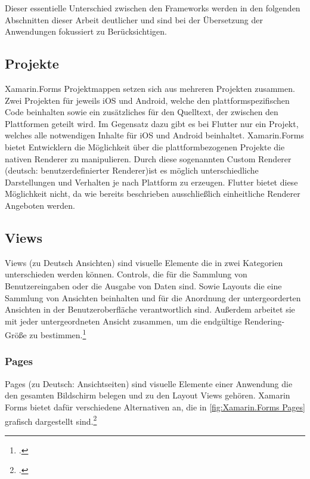 Dieser essentielle Unterschied zwischen den Frameworks werden in den folgenden Abschnitten dieser Arbeit deutlicher und sind bei der Übersetzung der Anwendungen fokussiert zu Berücksichtigen. 
\subsection{Projekte}
Xamarin.Forms Projektmappen setzen sich aus mehreren Projekten zusammen.  Zwei Projekten für jeweils iOS und Android,  welche den plattformspezifischen Code beinhalten sowie ein zusätzliches für den Quelltext,  der zwischen den Plattformen geteilt wird.  Im Gegensatz dazu gibt es bei Flutter nur ein Projekt, welches alle notwendigen Inhalte für iOS und Android beinhaltet.  Xamarin.Forms bietet Entwicklern die Möglichkeit über die plattformbezogenen Projekte die nativen Renderer zu manipulieren.  Durch diese sogenannten Custom Renderer (deutsch: benutzerdefinierter Renderer)ist es möglich unterschiedliche Darstellungen und Verhalten je nach Plattform zu erzeugen.  Flutter bietet diese Möglichkeit nicht, da wie bereits beschrieben ausschließlich einheitliche Renderer Angeboten werden. 

\subsection{Views}
Views (zu Deutsch Ansichten) sind visuelle Elemente die in zwei Kategorien unterschieden werden können.  Controls, die für die Sammlung von Benutzereingaben oder die Ausgabe von Daten sind.  Sowie Layouts die eine Sammlung von Ansichten beinhalten und für die Anordnung der untergeorderten Ansichten in der Benutzeroberfläche verantwortlich sind. Außerdem arbeitet sie mit jeder untergeordneten Ansicht zusammen, um die endgültige Rendering-Größe zu bestimmen.\footcite[Vgl.][Abgerufen am 28.10.2020]{Ritscher2020}
\subsubsection{Pages}
Pages (zu Deutsch: Ansichtseiten) sind visuelle Elemente einer Anwendung die den gesamten Bildschirm belegen und zu den Layout Views gehören.  Xamarin Forms bietet dafür 
verschiedene Alternativen an,  die in \ref{fig:Xamarin.Forms Pages} grafisch dargestellt sind.\footcite[Vgl.][Abgerufen am 28.10.2020]{MicrosoftXamPages2016}

